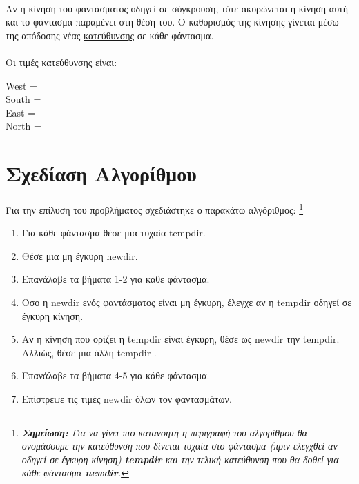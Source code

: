 \documentclass[12pt,a4paper]{article}
\newcommand{\lt}{\latintext}
\begin{document}
\paragraph*{}
	Αν η κίνηση του φαντάσματος οδηγεί σε σύγκρουση, τότε ακυρώνεται η κίνηση αυτή και το φάντασμα παραμένει στη θέση του. 
	Ο καθορισμός της κίνησης γίνεται μέσω της απόδοσης νέας \underline{κατεύθυνσης} σε κάθε φάντασμα.
	\paragraph*{} Οι τιμές κατεύθυνσης  είναι: 

	
				\begin{center}
			
			 \lt West \; = \; 0 \\ 
		 \lt South \; =  	 \\	
			 \lt East  \; = \; 2 \\
		  \lt North \; = \; 3\\
		
	\end{center}
	
	\section{Σχεδίαση Αλγορίθμου}
	 \paragraph*{}
	Για την επίλυση του προβλήματος σχεδιάστηκε ο παρακάτω αλγόριθμος: \footnote{\emph{ \textbf{Σημείωση:} Για να γίνει πιο κατανοητή η περιγραφή του αλγορίθμου θα ονομάσουμε την κατεύθυνση που δίνεται τυχαία στο φάντασμα (πριν ελεγχθεί αν οδηγεί σε έγκυρη κίνηση) \textbf{{\lt tempdir}} και την τελική κατεύθυνση που θα δοθεί για κάθε φάντασμα \textbf{{\lt newdir}}.}} 
	\begin{enumerate}
		\item 	Για κάθε φάντασμα θέσε μια τυχαία {\lt tempdir}.
		\item 	Θέσε μια μη έγκυρη {\lt newdir}.
		\item 	Επανάλαβε τα βήματα 1-2 για κάθε φάντασμα.
		\item 	Όσο η {\lt newdir} ενός φαντάσματος είναι μη έγκυρη, έλεγχε αν η {\lt tempdir} οδηγεί σε έγκυρη κίνηση.
		\item 	Αν η κίνηση που ορίζει η {\lt tempdir} είναι έγκυρη, θέσε ως {\lt newdir} την {\lt tempdir}.
		Αλλιώς, θέσε μια άλλη {\lt tempdir}	.
		\item 	Επανάλαβε τα βήματα 4-5 για κάθε φάντασμα.
		\item	Επίστρεψε τις τιμές {\lt newdir} όλων τον φαντασμάτων.
	\end{enumerate}
	
\end{document}
